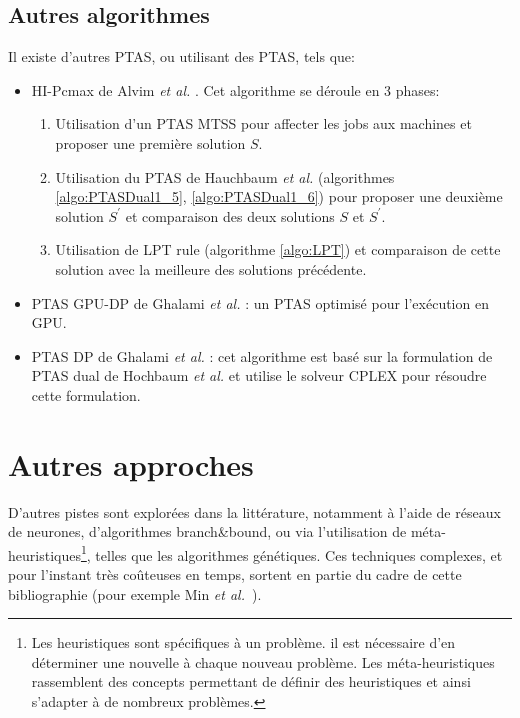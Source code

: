 \documentclass[a4paper,12pt]{report}
\theoremstyle{plain}				%
\theoremstyle{definition}				%
\begin{document}
\subsection{Autres algorithmes}

Il existe d'autres PTAS, ou utilisant des PTAS, tels que:
\begin{itemize}
\item HI-Pcmax de Alvim \emph{et al.} \cite{alvim2004hybrid}.
  Cet algorithme se déroule en 3 phases:
  \begin{enumerate}
  \item Utilisation d'un PTAS MTSS pour affecter les jobs aux machines
    et proposer une première solution $S$.
  \item Utilisation du PTAS de Hauchbaum \emph{et al.}
    (algorithmes \ref{algo:PTASDual1_5}, \ref{algo:PTASDual1_6}) pour
    proposer une deuxième solution $S^\prime$
    et comparaison des deux solutions $S$ et $S^\prime$.
  \item Utilisation de LPT rule (algorithme \ref{algo:LPT}) et
    comparaison de cette solution avec la meilleure des solutions
    précédente.
  \end{enumerate}

\item PTAS GPU-DP de Ghalami \emph{et al.} \cite{li2018gpu}:
  un PTAS optimisé pour l'exécution en GPU.

\item PTAS DP de Ghalami \emph{et al.}
  \cite{ghalami2019scheduling}: cet algorithme est basé sur la
  formulation de PTAS dual de Hochbaum \emph{et al.}
  et utilise le solveur CPLEX pour résoudre cette formulation.
\end{itemize}


\section{Autres approches} \label{sec:autresApproches}

D'autres pistes sont explorées dans la littérature, notamment à l'aide
de réseaux de neurones, d'algorithmes branch\&bound, ou via
l'utilisation de méta-heuristiques\footnote{Les heuristiques sont
spécifiques à un problème. il est nécessaire d'en déterminer une
nouvelle à chaque nouveau problème. Les méta-heuristiques rassemblent
des concepts permettant de définir des heuristiques et ainsi s'adapter
à de nombreux problèmes.}, telles que les algorithmes génétiques.
Ces techniques complexes, et pour l'instant très coûteuses en temps,
sortent en partie du cadre de cette bibliographie (pour exemple Min
\emph{et al.}~\cite{min1999genetic}).
\end{document}
